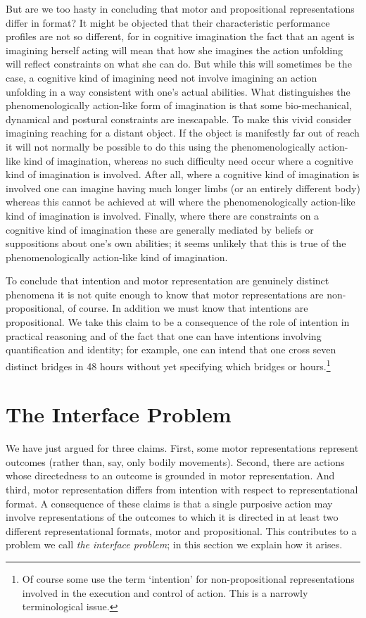 \documentclass[12pt,\papersize]{extarticle}
\begin{document}
But are we too hasty in concluding that motor and propositional representations differ in format?  It might be objected that their characteristic performance profiles are not so different, for in cognitive imagination the fact that an agent is imagining herself acting will mean that how she imagines the action unfolding will reflect constraints on what she can do. But while this will sometimes be the case, a cognitive kind of imagining need not involve imagining an action unfolding in a way consistent with one's actual abilities. What distinguishes the phenomenologically action-like form of imagination is that some bio-mechanical, dynamical and postural constraints are inescapable.  To make this vivid consider imagining reaching for a distant object.  If the object is manifestly far out of reach it will not normally be possible to do this using the phenomenologically action-like kind of imagination, whereas no such difficulty need occur where a cognitive kind of imagination is involved.  After all, where a cognitive kind of imagination is involved one can imagine having much longer limbs (or an entirely different body) whereas this cannot be achieved at will where the phenomenologically action-like kind of imagination is involved.  Finally, where there are constraints on a cognitive kind of imagination these are generally mediated by beliefs or suppositions about one's own abilities; it seems unlikely that this is true of the phenomenologically action-like kind of imagination.

To conclude that intention and motor representation are genuinely distinct phenomena it is not quite enough to know that motor representations are non-propositional, of course. In addition we must know that intentions are propositional. We take this claim to be a consequence of the role of intention in practical reasoning and of the fact that one can have intentions involving quantification and identity; for example, one can intend that one cross seven distinct bridges in 48 hours without yet specifying which bridges or hours.\footnote{ Of course some use the term `intention' for non-propositional representations involved in the execution and control of action.  This is a narrowly terminological issue.} 



\section{The Interface Problem}

We have just argued for three claims. First, some motor representations represent outcomes (rather than, say, only bodily movements). Second, there are actions whose directedness to an outcome is grounded in motor representation. And third, motor representation differs from intention with respect to representational format. A consequence of these claims is that a single purposive action may involve representations of the outcomes to which it is directed in at least two different representational formats, motor and propositional. This contributes to a problem we call \emph{the interface problem}; in this section we explain how it arises.  
\end{document}
